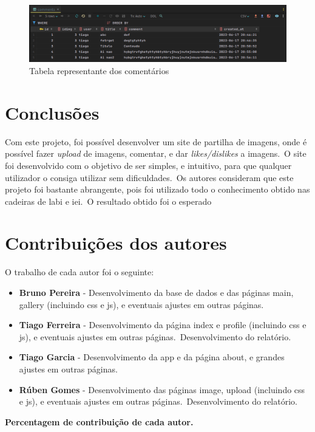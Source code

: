 \documentclass{report}
\begin{document}
\begin{figure}[H]
    \centering
    \includegraphics[scale=0.2]{../images/comments}
    \caption{Tabela representante dos comentários}
    \label{fig:comments}
\end{figure}

\chapter{Conclusões}
\label{chap.conclusao}
Com este projeto, foi possível desenvolver um site de partilha de imagens, onde é possível fazer \textit{upload} de imagens, comentar, e dar \textit{likes/dislikes} a imagens.\ O site foi desenvolvido com o objetivo de ser simples, e intuitivo, para que qualquer utilizador o consiga utilizar sem dificuldades.\ Os autores consideram que este projeto foi bastante abrangente, pois foi utilizado todo o conhecimento obtido nas cadeiras de \ac{labi} e \ac{iei}.\ O resultado obtido foi o esperado

\chapter*{Contribuições dos autores}
O trabalho de cada autor foi o seguinte:
\begin{itemize}
    \item \textbf{Bruno Pereira} - Desenvolvimento da base de dados e das páginas main, gallery (incluindo \ac{css} e \ac{js}), e eventuais ajustes em outras páginas.
    \item \textbf{Tiago Ferreira} - Desenvolvimento da página index e profile (incluindo \ac{css} e \ac{js}), e eventuais ajustes em outras páginas.\ Desenvolvimento do relatório.
    \item \textbf{Tiago Garcia} - Desenvolvimento da app e da página about, e grandes ajustes em outras páginas.
    \item \textbf{Rúben Gomes} - Desenvolvimento das páginas image, upload (incluindo \ac{css} e \ac{js}), e eventuais ajustes em outras páginas.\ Desenvolvimento do relatório.
\end{itemize}

\vspace{10pt}
\textbf{Percentagem de contribuição de cada autor.}\\
\end{document}
